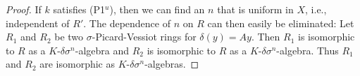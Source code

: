 \documentclass[oneside,reqno]{amsart}
\theoremstyle{definition}
\newcommand{\s}{\sigma}
\newcommand{\de}{\delta}
\newcommand{\ds}{\delta\sigma}
\newcommand{\po}{{\rm{(P1$^u$)}}}
\newcommand{\ab}[1]{\todo[inline,color=blue!20!white]{\textbf{Annette:} #1}}
\begin{document}
\begin{proof}
	 If $k$ satisfies \po{}, then we can find an $n$ that is uniform in $X$, i.e., independent of $R'$. The dependence of $n$ on $R$ can then easily be eliminated: Let $R_1$ and $R_2$ be two $\s$-Picard-Vessiot rings for $\de(y)=Ay$. Then $R_1$ is isomorphic to $R$ as a $K$-$\de\s^n$-algebra and $R_2$ is isomorphic to $R$ as a $K$-$\de\s^n$-algebra. Thus $R_1$ and $R_2$ are isomorphic as $K$-$\de\s^n$-algebras.
%	 
%	 
%	 
%	 
%	 
%	 
%
\end{proof}








 
\end{document}
